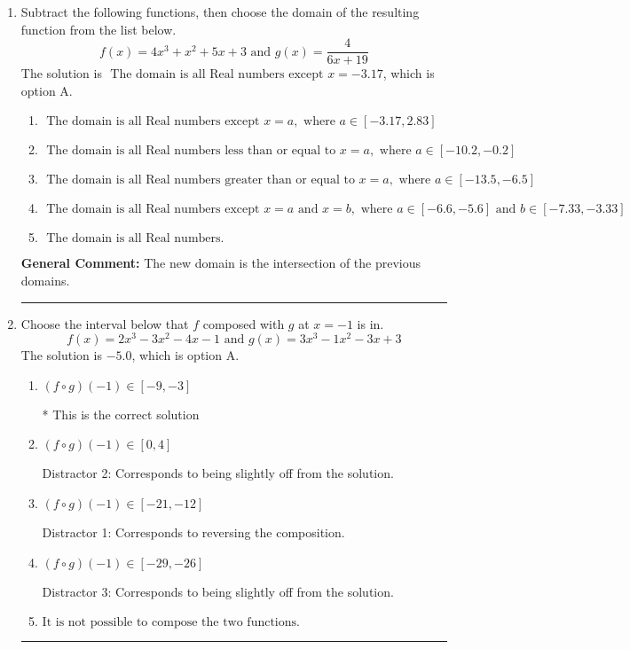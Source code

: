 \documentclass{extbook}[14pt]
\newcommand{\litem}[1]{\item #1

\rule{\textwidth}{0.4pt}}
\begin{document}
\begin{enumerate}\litem{
Subtract the following functions, then choose the domain of the resulting function from the list below.
\[ f(x) = 4x^{3} + x^{2} +5 x + 3 \text{ and } g(x) = \frac{4}{6x+19} \]The solution is \( \text{ The domain is all Real numbers except } x = -3.17 \), which is option A.\begin{enumerate}[label=\Alph*.]
\item \( \text{ The domain is all Real numbers except } x = a, \text{ where } a \in [-3.17, 2.83] \)


\item \( \text{ The domain is all Real numbers less than or equal to } x = a, \text{ where } a \in [-10.2, -0.2] \)


\item \( \text{ The domain is all Real numbers greater than or equal to } x = a, \text{ where } a \in [-13.5, -6.5] \)


\item \( \text{ The domain is all Real numbers except } x = a \text{ and } x = b, \text{ where } a \in [-6.6, -5.6] \text{ and } b \in [-7.33, -3.33] \)


\item \( \text{ The domain is all Real numbers. } \)


\end{enumerate}

\textbf{General Comment:} The new domain is the intersection of the previous domains.
}
\litem{
Choose the interval below that $f$ composed with $g$ at $x=-1$ is in.
\[ f(x) = 2x^{3} -3 x^{2} -4 x -1 \text{ and } g(x) = 3x^{3} -1 x^{2} -3 x + 3 \]The solution is \( -5.0 \), which is option A.\begin{enumerate}[label=\Alph*.]
\item \( (f \circ g)(-1) \in [-9, -3] \)

* This is the correct solution
\item \( (f \circ g)(-1) \in [0, 4] \)

 Distractor 2: Corresponds to being slightly off from the solution.
\item \( (f \circ g)(-1) \in [-21, -12] \)

 Distractor 1: Corresponds to reversing the composition.
\item \( (f \circ g)(-1) \in [-29, -26] \)

 Distractor 3: Corresponds to being slightly off from the solution.
\item \( \text{It is not possible to compose the two functions.} \)



\end{enumerate}}
\end{enumerate}
\end{document}
